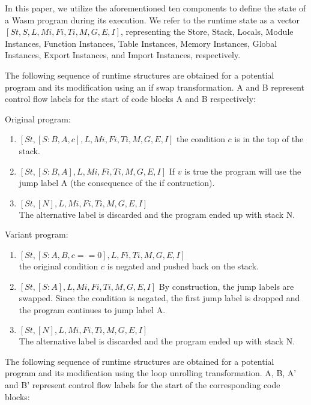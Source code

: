 In this paper, we utilize the aforementioned ten components to define the state of a Wasm program during its execution. 
We refer to the runtime state as a vector $[St, S, L, Mi, Fi, Ti, M, G, E, I]$, representing the Store, Stack, Locals, Module Instances, Function Instances, Table Instances, Memory Instances, Global Instances, Export Instances, and Import Instances, respectively.


The following sequence of runtime structures are obtained for a potential program and its modification using an if swap transformation. A and B represent control flow labels for the start of code blocks A and B respectively:

Original program:

\begin{enumerate}
    \item $[St, [S: B, A, c], L, Mi, Fi, Ti, M, G, E, I]$ the condition $c$ is in the top of the stack.
    \item $[St, [S: B, A], L, Mi, Fi, Ti, M, G, E, I]$
    If $v$ is true the program will use the jump label A (the consequence of the if contruction).
    \item $[St, [N], L, Mi, Fi, Ti, M, G, E, I]$\\
    The alternative label is discarded and the program ended up with stack N.
\end{enumerate}

Variant program:

\begin{enumerate}
    \item $[St, [S: A, B, c == 0], L, Fi, Ti, M, G, E, I]$\\ the original condition $c$ is negated and pushed back on the stack.
    \item $[St, [S: A], L, Mi, Fi, Ti, M, G, E, I]$
    By construction, the jump labels are swapped. Since the condition is negated, the first jump label is dropped and the program continues to jump label A. 
    \item $[St, [N], L, Mi, Fi, Ti, M, G, E, I]$\\
    The alternative label is discarded and the program ended up with stack N.
\end{enumerate}



The following sequence of runtime structures are obtained for a potential program and its modification using the loop unrolling transformation. A, B, A' and B' represent control flow labels for the start of the corresponding code blocks:


